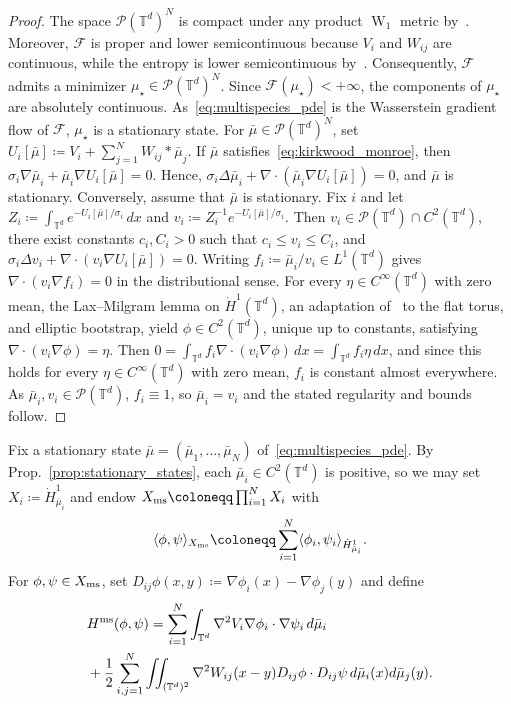 \documentclass[letterpaper, 10pt, conference]{ieeeconf}
\newcommand{\T}{\mathbb{T}}
\newcommand{\Pcal}{\mathcal{P}}
\newcommand{\F}{\mathcal{F}}
\newcommand{\potential}[1][\mu]{\dot{H}^1_{#1}}
\newcommand{\dotHk}[1][k]{\dot{H}^{#1}}
\begin{document}
\begin{proof}
    The space $\Pcal(\T^d)^N$ is compact under any product $\operatorname{W}_1$ metric by~\cite[Prop.~7.1.5 and Thm.~5.1.3]{AmbrosioGigliSavare2008}. 
    Moreover, $\F$ is proper and lower semicontinuous because $V_i$ and $W_{ij}$ are continuous, while the entropy is lower semicontinuous by~\cite[Lem.~9.4.3]{AmbrosioGigliSavare2008}. 
    Consequently, $\F$ admits a minimizer $\mu_\star \in \Pcal(\T^d)^N$.
    Since $\F(\mu_\star) < +\infty$, the components of $\mu_\star$ are absolutely continuous.
    As~\eqref{eq:multispecies_pde} is the Wasserstein gradient flow of $\F$, $\mu_\star$ is a stationary state.
    For $\bar\mu \in \Pcal(\T^d)^N$, set $U_i[\bar\mu] \coloneqq V_i + \sum_{j=1}^N W_{ij} \ast \bar\mu_j$. 
    If $\bar\mu$ satisfies~\eqref{eq:kirkwood_monroe}, then $\sigma_i \nabla\bar\mu_i + \bar\mu_i \nabla U_i[\bar\mu] = 0$.
    Hence, $\sigma_i \Delta\bar\mu_i + \nabla \cdot (\bar\mu_i \nabla U_i[\bar\mu]) = 0$, and $\bar\mu$ is stationary.
    Conversely, assume that $\bar\mu$ is stationary. 
    Fix $i$ and let $Z_i \coloneqq \int_{\T^d} e^{-U_i[\bar\mu]/\sigma_i} \, dx$ and $v_i \coloneqq Z_i^{-1}e^{-U_i[\bar\mu]/\sigma_i}$. 
    Then $v_i \in \Pcal(\T^d) \cap C^2(\T^d)$, there exist constants $c_i, C_i > 0$ such that $c_i \le v_i \le C_i$, and $\sigma_i\Delta v_i + \nabla \cdot (v_i\nabla U_i[\bar\mu]) = 0$.
    Writing $f_i \coloneqq \bar\mu_i/v_i \in L^1(\T^d)$ gives $\nabla \cdot (v_i \nabla f_i) = 0$ in the distributional sense. 
    For every $\eta \in C^\infty(\T^d)$ with zero mean, the Lax--Milgram lemma on $\dotHk[1](\T^d)$, an adaptation of~\cite[Thm.~8.8]{gilbarg2001elliptic} to the flat torus, and elliptic bootstrap, yield $\phi \in C^2(\T^d)$, unique up to constants, satisfying $\nabla \cdot (v_i \nabla\phi) = \eta$.
    Then $0 = \int_{\T^d} f_i \nabla \cdot (v_i \nabla\phi) \, dx = \int_{\T^d} f_i\eta \, dx$, and since this holds for every $\eta \in C^\infty(\T^d)$ with zero mean, $f_i$ is constant almost everywhere. 
    As $\bar\mu_i, v_i \in \Pcal(\T^d)$, $f_i \equiv 1$, so $\bar\mu_i = v_i$ and the stated regularity and bounds follow.
\end{proof}



Fix a stationary state $\bar\mu = (\bar\mu_1, \ldots, \bar\mu_N)$ of~\eqref{eq:multispecies_pde}.
By Prop.~\ref{prop:stationary_states}, each $\bar\mu_i \in C^2(\T^d)$ is positive, so we may set $X_i \coloneqq \potential[\bar\mu_i]$ and endow $X_{\rm ms} \coloneqq \prod_{i=1}^N X_i$ with
\[
\langle \phi, \psi \rangle_{X_{\rm ms}} \coloneqq \sum_{i=1}^N \langle \phi_i, \psi_i \rangle_{\potential[\bar\mu_i]}.
\]
For $\phi, \psi \in X_{\rm ms}$, set $D_{ij} \phi(x,y) \!\coloneqq\! \nabla\phi_i(x) -\! \nabla\phi_j(y)$ and define
\begin{align} 
    &H^{\rm ms}(\phi,\psi) = \sum_{i=1}^N \int_{\T^d} \nabla^2 V_i \nabla\phi_i \cdot \nabla\psi_i \, d\bar\mu_i \label{eq:multispecies_HE} \\ 
    &+ \frac{1}{2}\sum_{i,j=1}^N \iint_{(\T^d)^2} \nabla^2 W_{ij}(x-y) D_{ij}\phi \cdot D_{ij}\psi \, d\bar\mu_i(x) d\bar\mu_j(y) \notag. 
\end{align}
\end{document}
